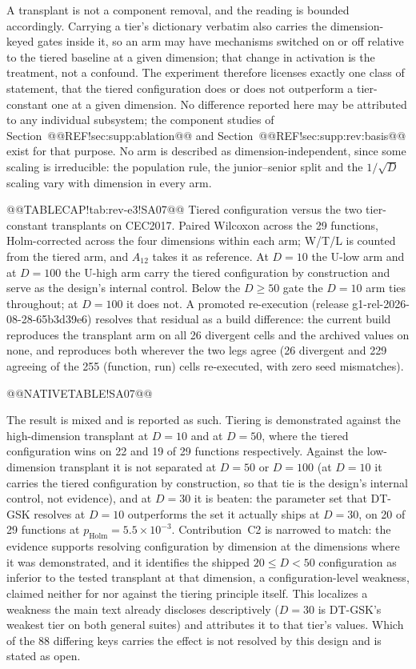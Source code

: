 \documentclass[10pt,a4paper]{article}
\newcommand{\dtgsk}{DT-GSK}
\begin{document}
A transplant is not a component removal, and the reading is bounded accordingly.
Carrying a tier's dictionary verbatim also carries the dimension-keyed gates
inside it, so an arm may have mechanisms switched on or off relative to the
tiered baseline at a given dimension; that change in activation is the
treatment, not a confound.  The experiment therefore licenses exactly one class
of statement, that the tiered configuration does or does not outperform a
tier-constant one at a given dimension.  No difference reported here may be
attributed to any individual subsystem; the component studies of
Section~@@REF!sec:supp:ablation@@ and Section~@@REF!sec:supp:rev:basis@@ exist for
that purpose.  No arm is described as dimension-independent, since some scaling
is irreducible: the population rule, the junior--senior split and the
$1/\sqrt{D}$ scaling vary with dimension in every arm.



@@TABLECAP!tab:rev-e3!SA07@@ Tiered configuration versus the two tier-constant transplants on
CEC2017.  Paired Wilcoxon across the 29 functions, Holm-corrected across the four
dimensions within each arm; W/T/L is counted from the tiered arm, and
$A_{12}$ takes it as reference.  At $D = 10$ the U-low arm and at $D = 100$ the
U-high arm carry the tiered configuration by construction and serve as the
design's internal control.  Below the $D \ge 50$ gate the $D = 10$ arm ties
throughout; at $D = 100$ it does not.  A promoted re-execution (release
g1-rel-2026-08-28-65b3d39e6) resolves that residual as a build difference:
the current build reproduces the transplant arm on all 26 divergent cells and
the archived values on none, and reproduces both wherever the two legs agree
(26 divergent and 229 agreeing of the 255 (function, run) cells re-executed,
with zero seed mismatches).

@@NATIVETABLE!SA07@@




The result is mixed and is reported as such.  Tiering is demonstrated against
the high-dimension transplant at $D = 10$ and at $D = 50$, where the tiered
configuration wins on 22 and 19 of 29 functions respectively.  Against the
low-dimension transplant it is not separated at $D = 50$ or $D = 100$ (at
$D = 10$ it carries the tiered configuration by construction, so that tie is
the design's internal control, not evidence), and at $D = 30$ it is beaten: the parameter set that \dtgsk{} resolves at $D = 10$
outperforms the set it actually ships at $D = 30$, on 20 of 29 functions at
$p_{\mathrm{Holm}} = 5.5\times10^{-3}$.  Contribution~C2 is narrowed to match:
the evidence supports resolving configuration by dimension at the dimensions
where it was demonstrated, and it identifies the shipped $20 \le D < 50$
configuration as inferior to the tested transplant at that dimension, a
configuration-level weakness, claimed neither for nor against the tiering
principle itself.  This localizes a
weakness the main text already discloses descriptively ($D = 30$
is \dtgsk{}'s weakest tier on both general suites) and attributes it to that
tier's values.  Which of the 88 differing keys carries the effect is not
resolved by this design and is stated as open.
\end{document}
